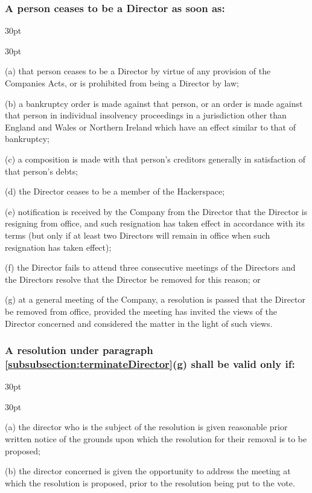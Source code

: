 \documentclass[12pt]{article}
\def\clauseindent{30pt}
\newenvironment{subindentlist}{\begin{adjustwidth}{\clauseindent}{}\begin{labeledlist}{\clauseindent}}{\end{labeledlist}\end{adjustwidth}}
\begin{document}
\subsubsection{\label{subsubsection:terminateDirector}A person ceases to be a Director as soon as:}
\begin{subindentlist}
    \item [(a)] that person ceases to be a Director by virtue of any provision of the Companies Acts, or is prohibited from being a Director by law;
    \item [(b)] a bankruptcy order is made against that person, or an order is made against that person in individual insolvency proceedings in a jurisdiction other than England and Wales or Northern Ireland which have an effect similar to that of bankruptcy;
    \item [(c)] a composition is made with that person's creditors generally in satisfaction of that person's debts;
    \item [(d)] the Director ceases to be a member of the Hackerspace;
    \item [(e)] notification is received by the Company from the Director that the Director is resigning from office, and such resignation has taken effect in accordance with its terms (but only if at least two Directors will remain in office when such resignation has taken effect);
    \item [(f)] the Director fails to attend three consecutive meetings of the Directors and the Directors resolve that the Director be removed for this reason; or
    \item [(g)] at a general meeting of the Company, a resolution is passed that the Director be removed from office, provided the meeting has invited the views of the Director concerned and considered the matter in the light of such views.
\end{subindentlist}
\subsubsection{A resolution under paragraph \ref{subsubsection:terminateDirector}(g) shall be valid only if:}
\begin{subindentlist}
    \item [(a)] the director who is the subject of the resolution is given reasonable prior written notice of the grounds upon which the resolution for their removal is to be proposed;
    \item [(b)] the director concerned is given the opportunity to address the meeting at which the resolution is proposed, prior to the resolution being put to the vote.
\end{subindentlist}
\end{document}
